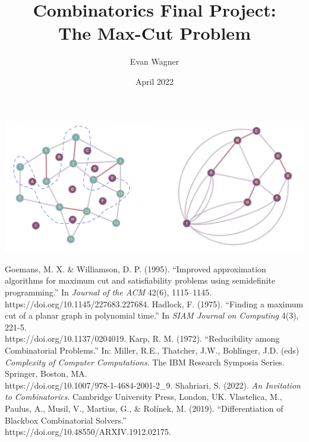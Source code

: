 \documentclass{article}
\title{Combinatorics Final Project: \\ The Max-Cut Problem}
\author{Evan Wagner}
\date{April 2022}
\begin{document}
\maketitle

\vspace{1in}

\includegraphics[scale=.5, center]{planar_dual_cut.png}









\begin{thebibliography}{99}
     Goemans, M. X. \& Williamson, D. P. (1995). ``Improved approximation algorithms for maximum cut and satisfiability problems using semidefinite programming.'' In {\em Journal of the ACM} 42(6), 1115–1145. \\
    https://doi.org/10.1145/227683.227684.
     Hadlock, F. (1975). ``Finding a maximum cut of a planar graph in polynomial time.'' In {\em SIAM Journal on Computing} 4(3), 221-5. \\
    https://doi.org/10.1137/0204019.
     Karp, R. M. (1972). ``Reducibility among Combinatorial Problems.'' In: Miller, R.E., Thatcher, J.W., Bohlinger, J.D. (eds) {\em Complexity of Computer Computations}. The IBM Research Symposia Series. Springer, Boston, MA. \\ https://doi.org/10.1007/978-1-4684-2001-2\_9.
     Shahriari, S. (2022). {\em An Invitation to Combinatorics}. Cambridge University Press, London, UK.
     Vlastelica, M., Paulus, A., Musil, V., Martius, G., \& Rolínek, M. (2019). ``Differentiation of Blackbox Combinatorial Solvers.'' \\
    https://doi.org/10.48550/ARXIV.1912.02175.
\end{thebibliography}
\end{document}
